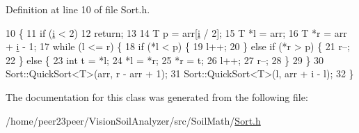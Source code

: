 Definition at line 10 of file Sort.\+h.


\begin{DoxyCode}
10                                                              \{
11     \textcolor{keywordflow}{if} (\hyperlink{_comparision_pictures_2_createtest_image_8m_a6f6ccfcf58b31cb6412107d9d5281426}{i} < 2)
12       \textcolor{keywordflow}{return};
13 
14     T p = arr[\hyperlink{_comparision_pictures_2_createtest_image_8m_a6f6ccfcf58b31cb6412107d9d5281426}{i} / 2];
15     T *l = arr;
16     T *r = arr + \hyperlink{_comparision_pictures_2_createtest_image_8m_a6f6ccfcf58b31cb6412107d9d5281426}{i} - 1;
17     \textcolor{keywordflow}{while} (l <= r) \{
18       \textcolor{keywordflow}{if} (*l < p) \{
19         l++;
20       \} \textcolor{keywordflow}{else} \textcolor{keywordflow}{if} (*r > p) \{
21         r--;
22       \} \textcolor{keywordflow}{else} \{
23         \textcolor{keywordtype}{int} t = *l;
24         *l = *r;
25         *r = t;
26         l++;
27         r--;
28       \}
29     \}
30     Sort::QuickSort<T>(arr, r - arr + 1);
31     Sort::QuickSort<T>(l, arr + i - l);
32   \}
\end{DoxyCode}


The documentation for this class was generated from the following file\+:\begin{DoxyCompactItemize}
\item 
/home/peer23peer/\+Vision\+Soil\+Analyzer/src/\+Soil\+Math/\hyperlink{_sort_8h}{Sort.\+h}\end{DoxyCompactItemize}
